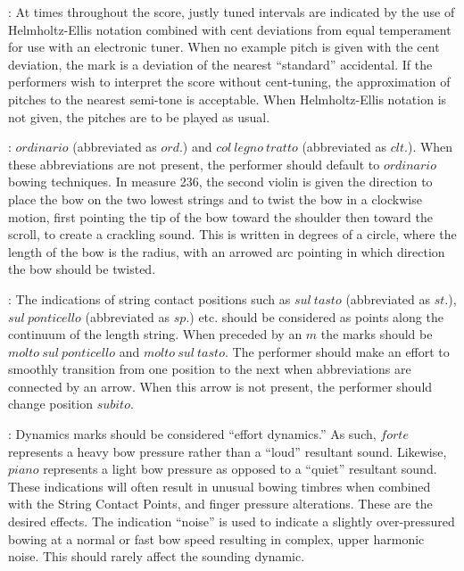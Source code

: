 \documentclass[11pt]{article}
\newcommand*\circled[1]{\tikz[baseline=(char.base)]{
            \node[shape=circle,draw,inner sep=1pt] (char) {#1};}}
\begin{document}
\begingroup
\begin{center}

 : At times throughout the score, justly tuned intervals are indicated by the use of Helmholtz-Ellis notation combined with cent deviations from equal temperament for use with an electronic tuner. When no example pitch is given with the cent deviation, the mark is a deviation of the nearest ``standard'' accidental. If the performers wish to interpret the score without cent-tuning, the approximation of pitches to the nearest semi-tone is acceptable. When Helmholtz-Ellis notation is not given, the pitches are to be played as usual.
\rightskip\leftskip
\phantom{text} \hfill \phantom{()}

 : \circled{1} $ordinario$ (abbreviated as $ord.$) and \circled{2} $col \ legno \ tratto$ (abbreviated as $clt.$). When these abbreviations are not present, the performer should default to $ordinario$ bowing techniques. \circled{3} In measure 236, the second violin is given the direction to place the bow on the two lowest strings and to twist the bow in a clockwise motion, first pointing the tip of the bow toward the shoulder then toward the scroll, to create a crackling sound. This is written in degrees of a circle, where the length of the bow is the radius, with an arrowed arc pointing in which direction the bow should be twisted.
\rightskip\leftskip
\phantom{text} \hfill \phantom{()}

 : The indications of string contact positions such as $sul \ tasto$ (abbreviated as $st.$), $sul \ ponticello$ (abbreviated as $sp.$) etc. should be considered as points along the continuum of the length string. When preceded by an $m$ the marks should be $molto \ sul \ ponticello$ and $molto \ sul \ tasto.$ The performer should make an effort to smoothly transition from one position to the next when abbreviations are connected by an arrow. When this arrow is not present, the performer should change position $subito$.
\rightskip\leftskip
\phantom{text} \hfill \phantom{()}

 : Dynamics marks should be considered ``effort dynamics.'' As such, $forte$ represents a heavy bow pressure rather than a ``loud'' resultant sound. Likewise, $piano$ represents a light bow pressure as opposed to a ``quiet'' resultant sound. These indications will often result in unusual bowing timbres when combined with the String Contact Points, and finger pressure alterations. These are the desired effects. The indication ``noise'' is used to indicate a slightly over-pressured bowing at a normal or fast bow speed resulting in complex, upper harmonic noise. This should rarely affect the sounding dynamic.
\rightskip\leftskip
\phantom{text} \hfill \phantom{()}


\end{center}
\end{document}
